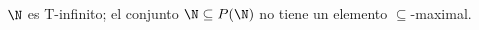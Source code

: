 
\begin{exercise}[1.11]
  $\N$ es T-infinito; el conjunto $\N \subseteq P(\N)$ no tiene un elemento $\subseteq$-maximal.
\end{exercise}